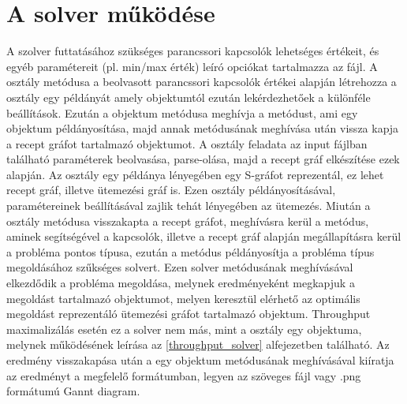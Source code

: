 \section{A solver működése}
A szolver futtatásához szükséges parancssori kapcsolók lehetséges értékeit, és egyéb paramétereit (pl. min/max érték) leíró opciókat tartalmazza az  fájl. 
A  osztály  metódusa a beolvasott parancssori kapcsolók értékei alapján létrehozza a  osztály egy példányát amely objektumtól ezután lekérdezhetőek a különféle beállítások.
Ezután a  objektum  metódusa meghívja a  metódust, ami egy  objektum példányosítása, majd annak  metódusának meghívása után vissza kapja a recept gráfot tartalmazó  objektumot.
A  osztály feladata az input fájlban található paraméterek beolvasása, parse-olása, majd a recept gráf elkészítése ezek alapján.
Az  osztály egy példánya lényegében egy S-gráfot reprezentál, ez lehet recept gráf, illetve ütemezési gráf is.
Ezen osztály példányosításával, paramétereinek beállításával zajlik tehát lényegében az ütemezés.
Miután a  osztály  metódusa visszakapta a recept gráfot, meghívásra kerül a  metódus, aminek segítségével a kapcsolók, illetve a recept gráf alapján megállapításra kerül a probléma pontos típusa, ezután a  metódus példányosítja a probléma típus megoldásához szűkséges solvert.
Ezen solver  metódusának meghívásával elkezdődik a probléma megoldása, melynek eredményeként megkapjuk a megoldást tartalmazó  objektumot, melyen keresztül elérhető az optimális megoldást reprezentáló ütemezési gráfot tartalmazó  objektum.
Throughput maximalizálás esetén ez a solver nem más, mint a  osztály egy objektuma, melynek működésének leírása az \ref{throughput_solver} alfejezetben található.  
Az eredmény visszakapása után a  egy  objektum  metódusának meghívásával kiíratja az eredményt a megfelelő formátumban, legyen az szöveges fájl vagy .png formátumú Gannt diagram.
